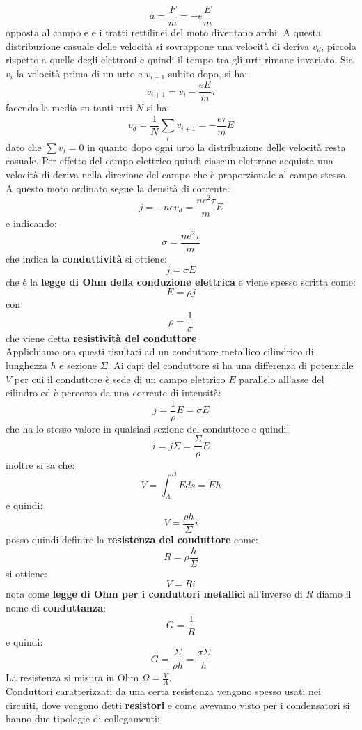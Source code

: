 \documentclass[a4paper,12pt, oneside]{book}
\begin{document}
$$a=\frac{F}{m}=-e\frac{E}{m}$$
opposta al campo e e i tratti rettilinei del moto diventano archi. A questa distribuzione casuale delle velocità si sovrappone una velocità di deriva $v_d$, piccola rispetto a quelle degli elettroni e quindi il tempo tra gli urti rimane invariato. Sia $v_i$ la velocità prima di un urto e $v_{i+1}$ subito dopo, si ha:
$$v_{i+1}=v_i-\frac{eE}{m}\tau$$
facendo la media su tanti urti $N$ si ha:
$$v_d=\frac{1}{N}\sum_i v_{i+1}=-\frac{e\tau}{m}E$$
dato che $\sum v_i=0$ in quanto dopo ogni urto la distribuzione delle velocità resta casuale. Per effetto del campo elettrico quindi ciascun elettrone acquista una velocità di deriva nella direzione del campo che è proporzionale al campo stesso.\\
A questo moto ordinato segue la densità di corrente:
$$j=-nev_d=\frac{ne^2\tau}{m}E$$
e indicando:
$$\sigma=\frac{ne^2\tau}{m}$$
che indica la \textbf{conduttività} si ottiene:
$$j=\sigma E$$
che è la \textbf{legge di Ohm della conduzione elettrica}
e viene spesso scritta come:
$$E=\rho j$$
con $$\rho =\frac{1}{\sigma}$$
che viene detta \textbf{resistività del conduttore}\\
Applichiamo ora questi risultati ad un conduttore metallico cilindrico
di lunghezza $h$ e sezione $\Sigma$. Ai capi del conduttore si ha una differenza di potenziale $V$ per cui il conduttore è sede di un campo elettrico $E$ parallelo all'asse del cilindro ed è percorso da una corrente di intensità:
$$j=\frac{1}{\rho}E=\sigma E$$
che ha lo stesso valore in qualsiasi sezione del conduttore e quindi:
$$i=j\Sigma=\frac{\Sigma}{\rho}E$$
inoltre si sa che:
$$V=\int_A^BEds=Eh$$
e quindi:
$$V=\frac{\rho h}{\Sigma}i$$
posso quindi definire la \textbf{resistenza del conduttore} come:
$$R=\rho\frac{h}{\Sigma}$$
si ottiene:
$$V=Ri$$
nota come \textbf{legge di Ohm per i conduttori metallici}
all'inverso di $R$ diamo il nome di \textbf{conduttanza}:
$$G=\frac{1}{R}$$
e quindi:
$$G=\frac{\Sigma}{\rho h}=\frac{\sigma\Sigma}{h}$$
La resistenza si misura in Ohm $\Omega=\frac{V}{A}$.\\
Conduttori caratterizzati da una certa resistenza vengono spesso usati nei circuiti, dove vengono detti \textbf{resistori} e come avevamo visto per i condensatori si hanno due tipologie di collegamenti:
\end{document}
